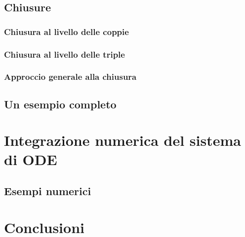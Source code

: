 \documentclass[12pt,a4paper,twoside]{report}
\begin{document}







\section{Chiusure}

\lipsum[6-10]

\subsection{Chiusura al livello delle coppie}

\lipsum[6-10]

\subsection{Chiusura al livello delle triple}

\lipsum[6-10]

\subsection{Approccio generale alla chiusura}

\lipsum[6-10]

\section{Un esempio completo}

\lipsum[6-10]

\chapter{Integrazione numerica del sistema di ODE}\label{ode}

\lipsum[6-7]

\section{Esempi numerici}

\lipsum[8-10]

\chapter*{Conclusioni}

\lipsum[11-14]




\cleardoublepage
\listoffigures
{}
\listoftables
{}
\tableofcontents
\end{document}
